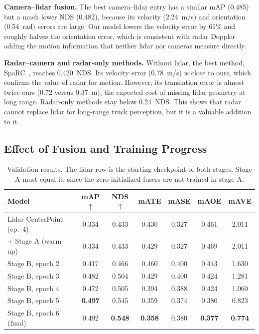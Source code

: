 \documentclass[conference]{IEEEtran}
\begin{document}
\textbf{Camera--lidar fusion.} The best camera--lidar entry has a similar mAP (0.485) but a much lower NDS (0.482),
because its velocity (2.24~m/s) and orientation (0.54~rad) errors are large. Our model lowers the velocity error by 61\% and
roughly halves the orientation error, which is consistent with radar Doppler adding the motion information that neither lidar nor cameras measure
directly.

\textbf{Radar--camera and radar-only methods.} Without lidar, the best method, SpaRC~\cite{wolters2024sparc}, reaches
0.420~NDS. Its velocity error (0.78~m/s) is close to ours, which confirms the value of radar for motion. However, its
translation error is almost twice ours (0.72 versus 0.37~m), the expected cost of missing lidar geometry at long
range. Radar-only methods stay below 0.24~NDS. This shows that radar cannot replace lidar for long-range truck
perception, but it is a valuable addition to it.

\subsection{Effect of Fusion and Training Progress}

\begin{table}[t]
\centering
\caption{Validation results. The lidar row is the starting checkpoint of both stages. Stage A must equal it, since the
zero-initialized fusers are not trained in stage A.}
\label{tab:val}
\setlength{\tabcolsep}{3.2pt}
\begin{tabular}{lcccccc}
\toprule
Model & mAP$\uparrow$ & NDS$\uparrow$ & mATE & mASE & mAOE & mAVE \\
\midrule
Lidar CenterPoint (ep.\ 4)   & 0.334 & 0.433 & 0.430 & 0.327 & 0.461 & 2.011 \\
+ Stage A (warm-up)          & 0.334 & 0.433 & 0.429 & 0.327 & 0.469 & 2.011 \\
\midrule
Stage B, epoch 2             & 0.417 & 0.466 & 0.460 & 0.400 & 0.443 & 1.630 \\
Stage B, epoch 3             & 0.482 & 0.504 & 0.429 & 0.400 & 0.424 & 1.281 \\
Stage B, epoch 4             & 0.472 & 0.505 & 0.394 & 0.388 & 0.424 & 1.060 \\
Stage B, epoch 5             & \textbf{0.497} & 0.545 & 0.359 & 0.374 & 0.380 & 0.823 \\
Stage B, epoch 6 (final)     & 0.492 & \textbf{0.548} & \textbf{0.358} & 0.380 & \textbf{0.377} & \textbf{0.774} \\
\bottomrule
\end{tabular}
\end{table}
\end{document}
